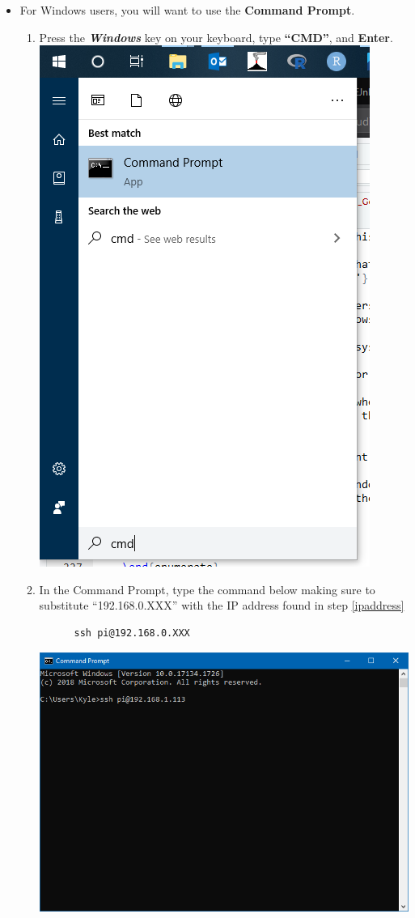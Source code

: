 \documentclass{article}
\begin{document}
\begin{itemize}
    \item For Windows users, you will want to use the \textbf{Command Prompt}.
    \begin{enumerate}
      \item Press the \textbf{\textit{Windows}} key on your keyboard, type \textbf{``CMD''}, and \textbf{Enter}.
\newline
\newline
\includegraphics[scale=0.70]{cmd}
      \item In the Command Prompt, type the command below making sure to substitute ``192.168.0.XXX'' with the IP address found in step \ref{ipaddress}
      \begin{lstlisting}
      ssh pi@192.168.0.XXX 
      \end{lstlisting}
      \includegraphics[width=1.00\textwidth]{cmdssh}

\end{enumerate}
\end{itemize}
\end{document}
